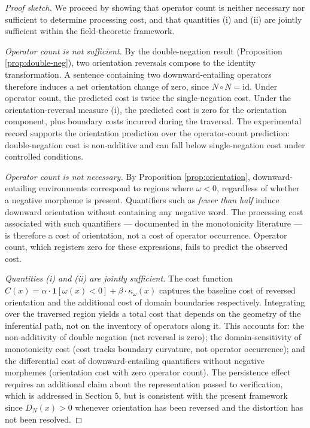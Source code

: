 \documentclass[12pt]{article}
\theoremstyle{remark}
\begin{document}
\begin{proof}[Proof sketch]
We proceed by showing that operator count is neither necessary nor
sufficient to determine processing cost, and that quantities (i) and (ii)
are jointly sufficient within the field-theoretic framework.

\medskip
\noindent\textit{Operator count is not sufficient.} By the double-negation
result (Proposition \ref{prop:double-neg}), two orientation reversals
compose to the identity transformation. A sentence containing two
downward-entailing operators therefore induces a net orientation change of
zero, since $N \circ N = \mathrm{id}$. Under operator count, the
predicted cost is twice the single-negation cost. Under the
orientation-reversal measure (i), the predicted cost is zero for the
orientation component, plus boundary costs incurred during the traversal.
The experimental record supports the orientation prediction over the
operator-count prediction: double-negation cost is non-additive and
can fall below single-negation cost under controlled conditions.

\medskip
\noindent\textit{Operator count is not necessary.} By Proposition
\ref{prop:orientation}, downward-entailing environments correspond to
regions where $\omega < 0$, regardless of whether a negative morpheme is
present. Quantifiers such as \emph{fewer than half} induce downward
orientation without containing any negative word. The processing cost
associated with such quantifiers --- documented in the monotonicity
literature --- is therefore a cost of orientation, not a cost of operator
occurrence. Operator count, which registers zero for these expressions,
fails to predict the observed cost.

\medskip
\noindent\textit{Quantities (i) and (ii) are jointly sufficient.} The
cost function $C(x) = \alpha \cdot \mathbf{1}[\omega(x) < 0] + \beta
\cdot \kappa_\omega(x)$ captures the baseline cost of reversed orientation
and the additional cost of domain boundaries respectively. Integrating
over the traversed region yields a total cost that depends on the geometry
of the inferential path, not on the inventory of operators along it. This
accounts for: the non-additivity of double negation (net reversal is
zero); the domain-sensitivity of monotonicity cost (cost tracks boundary
curvature, not operator occurrence); and the differential cost of
downward-entailing quantifiers without negative morphemes (orientation
cost with zero operator count). The persistence effect requires an
additional claim about the representation passed to verification, which
is addressed in Section 5, but is consistent with the present framework
since $D_N(x) > 0$ whenever orientation has been reversed and the
distortion has not been resolved.
\end{proof}
\end{document}
